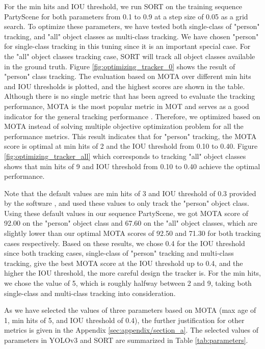 For the min hits and IOU threshold, we run SORT on the training sequence PartyScene for both parameters from 0.1 to 0.9 at a step size of 0.05 as a grid search. To optimize these parameters, we have tested both single-class of "person" tracking, and "all" object classes as multi-class tracking. We have chosen "person" for single-class tracking in this tuning since it is an important special case. For the "all" object classes tracking case, SORT will track all object classes available in the ground truth. Figure \ref{fig:optimizing_tracker_0} shows the result of "person" class tracking. The evaluation based on MOTA over different min hits and IOU thresholds is plotted, and the highest scores are shown in the table. Although there is no single metric that has been agreed to evaluate the tracking performance, MOTA is the most popular metric in MOT and serves as a good indicator for the general tracking performance \cite{milan_mot16_2016} \cite{bernardin_evaluating_2008}. Therefore, we optimized based on MOTA instead of solving multiple objective optimization problem for all the performance metrics. This result indicates that for "person" tracking, the MOTA score is optimal at min hits of 2 and the IOU threshold from 0.10 to 0.40. Figure \ref{fig:optimizing_tracker_all} which corresponds to tracking "all" object classes shows that min hits of 9 and IOU threshold from 0.10 to 0.40 achieve the optimal performance.

Note that the default values are min hits of 3 and IOU threshold of 0.3 provided by the software \cite{abewley_abewleysort_2021}, and \citeauthor{bewley_simple_2016} \cite{bewley_simple_2016} used these values to only track the "person" object class. Using these default values in our sequence PartyScene, we got MOTA score of 92.00 on the "person" object class and 67.60 on the "all" object classes, which are slightly lower than our optimal MOTA scores of 92.50 and 71.30 for both tracking cases respectively. Based on these results, we chose 0.4 for the IOU threshold since both tracking cases, single-class of "person" tracking and multi-class tracking, give the best MOTA score at the IOU threshold up to 0.4, and the higher the IOU threshold, the more careful design the tracker is. For the min hits, we chose the value of 5, which is roughly halfway between 2 and 9, taking both single-class and multi-class tracking into consideration.

As we have selected the values of three parameters based on MOTA (max age of 1, min hits of 5, and IOU threshold of 0.4), the further justification for other metrics is given in the Appendix \ref{sec:appendix/section_a}. The selected values of parameters in YOLOv3 and SORT are summarized in Table \ref{tab:parameters}.
